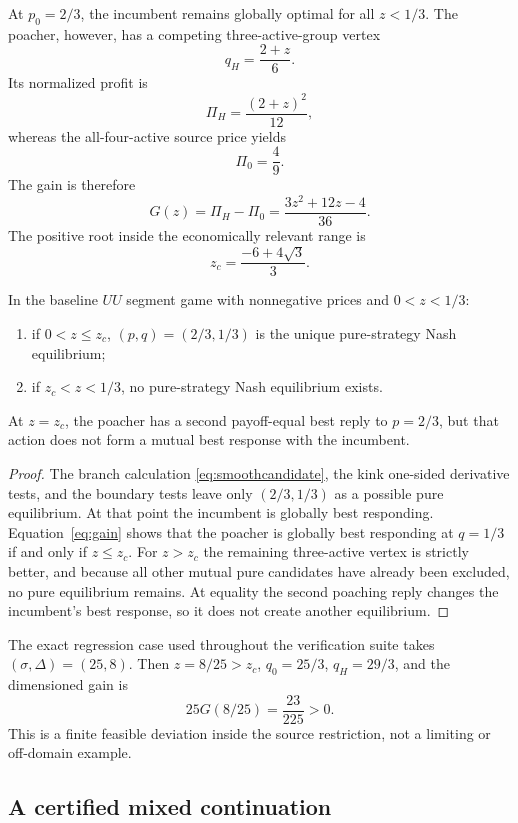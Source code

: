 At \(p_0=2/3\), the incumbent remains globally optimal for all \(z<1/3\).  The poacher, however, has a competing three-active-group vertex
\[
q_H=\frac{2+z}{6}.
\]
Its normalized profit is
\[
\Pi_H=\frac{(2+z)^2}{12},
\]
whereas the all-four-active source price yields
\[
\Pi_0=\frac49.
\]
The gain is therefore
\begin{equation}
G(z)=\Pi_H-\Pi_0
=\frac{3z^2+12z-4}{36}.
\label{eq:gain}
\end{equation}
The positive root inside the economically relevant range is
\[
z_c=\frac{-6+4\sqrt3}{3}.
\]

\begin{proposition}\label{prop:pure}
In the baseline \(UU\) segment game with nonnegative prices and \(0<z<1/3\):
\begin{enumerate}
\item if \(0<z\le z_c\), \((p,q)=(2/3,1/3)\) is the unique pure-strategy Nash equilibrium;
\item if \(z_c<z<1/3\), no pure-strategy Nash equilibrium exists.
\end{enumerate}
At \(z=z_c\), the poacher has a second payoff-equal best reply to \(p=2/3\), but that action does not form a mutual best response with the incumbent.
\end{proposition}

\begin{proof}
The branch calculation \eqref{eq:smoothcandidate}, the kink one-sided derivative tests, and the boundary tests leave only \((2/3,1/3)\) as a possible pure equilibrium.  At that point the incumbent is globally best responding.  Equation~\eqref{eq:gain} shows that the poacher is globally best responding at \(q=1/3\) if and only if \(z\le z_c\).  For \(z>z_c\) the remaining three-active vertex is strictly better, and because all other mutual pure candidates have already been excluded, no pure equilibrium remains.  At equality the second poaching reply changes the incumbent's best response, so it does not create another equilibrium.
\end{proof}

The exact regression case used throughout the verification suite takes \((\sigma,\Delta)=(25,8)\).  Then \(z=8/25>z_c\), \(q_0=25/3\), \(q_H=29/3\), and the dimensioned gain is
\[
25G(8/25)=\frac{23}{225}>0.
\]
This is a finite feasible deviation inside the source restriction, not a limiting or off-domain example.

\subsection{A certified mixed continuation}

